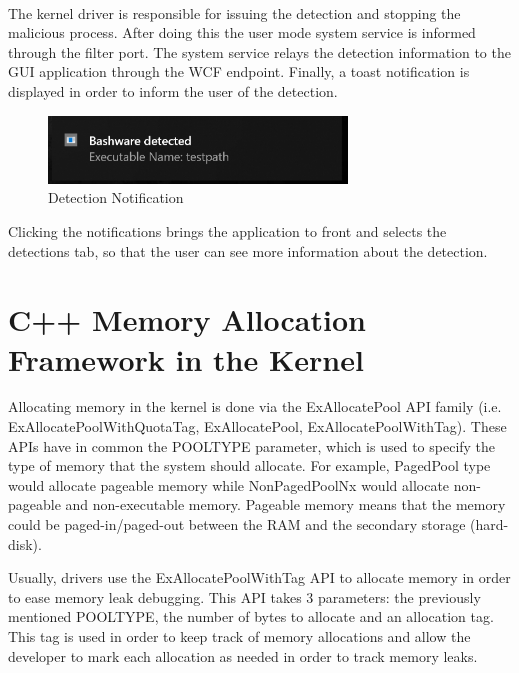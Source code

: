         \paragraph{}
        The kernel driver is responsible for issuing the detection and stopping the malicious process. After doing this the user mode system
        service is informed through the filter port. The system service relays the detection information to the GUI application through the WCF
        endpoint. Finally, a toast notification is displayed in order to inform the user of the detection.

        \begin{figure}[H]
            \centering
            \includegraphics[width=300px, keepaspectratio]{img/detection.png}
            \caption{Detection Notification}
            \label{fig:detection}
        \end{figure}

        Clicking the notifications brings the application to front and selects the detections tab, so that the user can see more information
        about the detection.


    \section{C++ Memory Allocation Framework in the Kernel}
        Allocating memory in the kernel is done via the ExAllocatePool API family (i.e. ExAllocatePoolWithQuotaTag, ExAllocatePool,
        ExAllocatePoolWithTag). These APIs have in common the POOL\textunderscore TYPE parameter, which is used to specify the type of memory
        that the system should allocate. For example, PagedPool type would allocate pageable memory while NonPagedPoolNx would allocate
        non-pageable and non-executable memory. Pageable memory means that the memory could be paged-in/paged-out between the RAM and the
        secondary storage (hard-disk).

        Usually, drivers use the ExAllocatePoolWithTag API to allocate memory in order to ease memory leak debugging. This API takes 3
        parameters: the previously mentioned POOL\textunderscore TYPE, the number of bytes to allocate and an allocation tag. This tag is used
        in order to keep track of memory allocations and allow the developer to mark each allocation as needed in order to track memory leaks.

